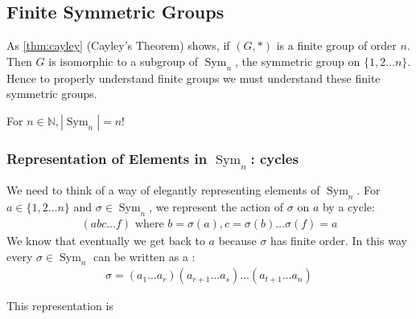 \documentclass{article}
\newcommand{\Sym}{\operatorname{Sym}}
\begin{document}
\subsection{Finite Symmetric Groups}
As \cref{thm:cayley} (Cayley’s Theorem) shows, if $(G, *)$ is a finite group of order $n$. Then $G$ is isomorphic to a subgroup of $\Sym_{n}$, the symmetric group on $\{1,2 \ldots n\} .$ Hence to properly understand finite groups we must understand these finite symmetric groups.

\begin{lema}
For $n \in \mathbb{N},\left|\Sym_{n}\right|=n !$
\end{lema} 
\subsubsection{Representation of Elements in $\Sym_{n}$: cycles}
We need to think of a way of elegantly representing elements of $\Sym_{n} .$ For $a \in\{1,2 \ldots n\}$ and $\sigma \in \Sym_{n}$, we represent the action of $\sigma$ on $a$ by a cycle:
\begin{align*}
(a b c \ldots f) \text { where } b=\sigma(a), c=\sigma(b) \ldots \sigma(f)=a
\end{align*}
We know that eventually we get back to $a$ because $\sigma$ has finite order. In this way every $\sigma \in \Sym_{n}$ can be written as a :
\begin{align*}
\sigma=\left(a_{1} \ldots a_{r}\right)\left(a_{r+1} \ldots a_{s}\right) \ldots\left(a_{t+1} \ldots a_{n}\right)
\end{align*}

This representation is 
\end{document}
